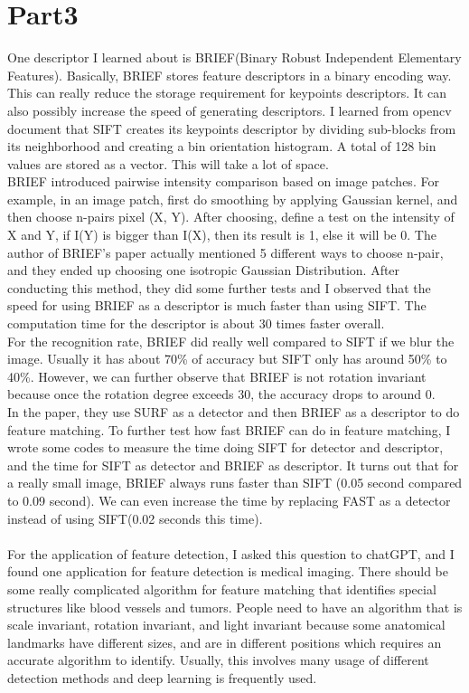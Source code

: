 \documentclass{article}
\begin{document}
\section*{Part3}
One descriptor I learned about is BRIEF(Binary Robust Independent Elementary Features).
Basically, BRIEF stores feature descriptors in a binary encoding way. This can really reduce the storage requirement for keypoints descriptors.
It can also possibly increase the speed of generating descriptors.
I learned from opencv document that SIFT creates its keypoints descriptor by dividing sub-blocks from its neighborhood and creating a bin orientation histogram.
A total of 128 bin values are stored as a vector. This will take a lot of space. 
\\
BRIEF introduced pairwise intensity comparison based on image patches.
For example, in an image patch, first do smoothing by applying Gaussian kernel, and then choose n-pairs pixel (X, Y).
After choosing, define a test on the intensity of X and Y, if I(Y) is bigger than I(X), then its result is 1, else it will be 0.
The author of BRIEF's paper actually mentioned 5 different ways to choose n-pair, and they ended up choosing one isotropic Gaussian Distribution.
After conducting this method, they did some further tests and I observed that the speed for using BRIEF as a descriptor is much faster than using SIFT.
The computation time for the descriptor is about 30 times faster overall.
\\
For the recognition rate, BRIEF did really well compared to SIFT if we blur the image. 
Usually it has about 70\% of accuracy but SIFT only has around 50\% to 40\%.
However, we can further observe that BRIEF is not rotation invariant because once the rotation degree exceeds 30, the accuracy drops to around 0.
\\
In the paper, they use SURF as a detector and then BRIEF as a descriptor to do feature matching.
To further test how fast BRIEF can do in feature matching, I wrote some codes to measure the time doing SIFT for detector and descriptor, and the time for SIFT as detector and BRIEF as descriptor.
It turns out that for a really small image, BRIEF always runs faster than SIFT (0.05 second compared to 0.09 second). We can even increase the time by replacing FAST as a detector instead of using SIFT(0.02 seconds this time).\\
\\
For the application of feature detection, I asked this question to chatGPT, and I found one application for feature detection is medical imaging.
There should be some really complicated algorithm for feature matching that identifies special structures like blood vessels and tumors.
People need to have an algorithm that is scale invariant, rotation invariant, and light invariant because some anatomical landmarks have different sizes, and are in different positions which requires an accurate algorithm to identify.
Usually, this involves many usage of different detection methods and deep learning is frequently used.
\end{document}
